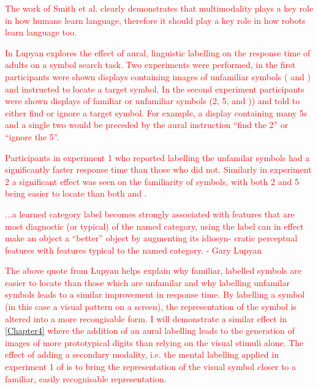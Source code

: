 \textcolor{red}{The work of Smith et al. clearly demonstrates that multimodality plays a key role in how humans learn language, therefore it should play a key role in how robots learn language too.}

\textcolor{red}{In \cite{lupyan2007reuniting} Lupyan explores the effect of aural, linguistic labelling on the response time of adults on a symbol search task. Two experiments were performed, in the first participants were shown displays containing images of  unfamiliar symbols ( and ) and instructed to locate a target symbol. In the second experiment participants were shown displays of familiar or unfamiliar symbols (2, 5,  and )) and told to either find or ignore a target symbol. For example, a display containing many 5s and a single two would be preceded by the aural instruction ``find the 2'' or ``ignore the 5''.}

\textcolor{red}{Participants in experiment 1 who reported labelling the unfamilar symbols had a significantly faster response time than those who did not. Similarly in experiment 2 a significant effect was seen on the familiarity of symbols, with both 2 and 5 being easier to locate than both  and .}

\begin{displayquote}
\textcolor{red}{...a learned category label becomes
strongly associated with features that are most diagnostic (or
typical) of the named category, using the label can in effect
make an object a “better” object by augmenting its idiosyn-
cratic perceptual features with features typical to the named
category. - Gary Lupyan}
\end{displayquote}

\textcolor{red}{The above quote from Lupyan helps explain why familiar, labelled symbols are easier to locate than those which are unfamilar and why labelling unfamilar symbols leads to a similar improvement in response time. By labelling a symbol (in this case a visual pattern on a screen), the representation of the symbol is altered into a more recongisable form. 
I will demonstrate a similar effect in \autoref{Chapter4} where the addition of an aural labelling leads to the generation of images of more prototypical digits than relying on the visual stimuli alone. The effect of adding a secondary modality, i.e. the mental labelling applied in experiment 1 of \cite{lupyan2007reuniting} is to bring the representation of the visual symbol closer to a familiar, easily recognisable representation.}


